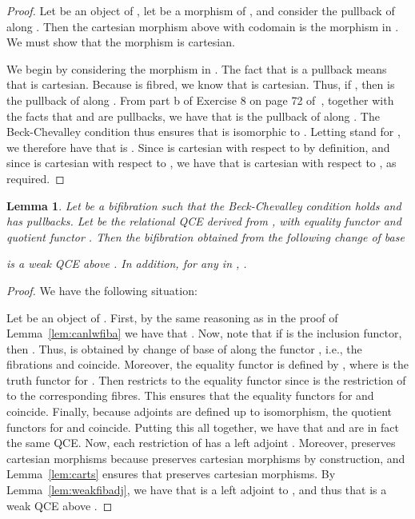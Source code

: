 \documentclass{LMCS}
\theoremstyle{plain}
\newtheorem{lemma}[theorem]{Lemma}
\theoremstyle{remark}
\theoremstyle{definition}
\begin{document}
\begin{proof}
Let  be an object of , let  be a
morphism of , and consider the pullback  of  along .  Then the cartesian morphism above  with
codomain  is the morphism  in . We must show that the morphism  is cartesian.

We begin by considering the morphism  in
. The fact that  is a pullback means that
 is cartesian. Because  is fibred, we know that
 is cartesian. Thus, if , then  is the pullback of 
along .
From part b of Exercise 8 on page 72 of~\cite{mac71},
together with the facts that  and  are pullbacks, we have that  is
the pullback of  along . The Beck-Chevalley
condition thus ensures that  is
isomorphic to .  Letting  stand for
, we therefore have that  is . Since  is
cartesian with respect to  by definition, and since  is
cartesian with respect to , we have that
 is cartesian with respect to
, as required.
\end{proof}

\begin{lemma}\label{lem:wqcer}
  Let  be a bifibration such that the Beck-Chevalley
  condition holds and  has pullbacks.  Let 
  be the relational QCE derived from , with equality functor
   and quotient functor .  Then the
  bifibration  obtained from the following
  change of base
  
  is a weak QCE above . In addition, for any  in ,
  .
\end{lemma}
\begin{proof}
  We have the following situation:
  
  Let  be an object of . First, by the same reasoning as in the
  proof of Lemma~\ref{lem:canlwfiba} we have that . Now,
  note that if  is the inclusion functor, then
  . Thus,  is obtained by change
  of base of  along the functor , i.e., the fibrations
   and  coincide.  Moreover, the equality functor
   is defined by
  , where  is the truth functor for
  . Then  restricts to the equality functor 
  since  is the restriction of  to the
  corresponding fibres. This ensures that the equality functors for
   and  coincide.  Finally, because adjoints are
  defined up to isomorphism, the quotient functors for  and
   coincide. Putting this all together, we have that
   and  are in fact the same QCE.  Now, each
  restriction  of  has a left adjoint .
  Moreover,  preserves cartesian morphisms because 
  preserves cartesian morphisms by construction, and
  Lemma~\ref{lem:carts} ensures that  preserves
  cartesian morphisms. By Lemma~\ref{lem:weakfibadj}, we have that
   is a left adjoint to , and thus that  is a
  weak QCE above .
\end{proof}
\end{document}

